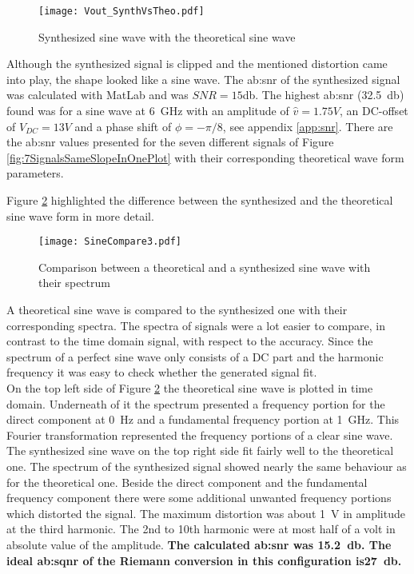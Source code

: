 \begin{figure}[htb!]
   \centering
   \texttt{[image: Vout\_SynthVsTheo.pdf]}
   \caption{Synthesized sine wave with the theoretical sine wave}
   \label{fig:SineWaveSynthVsTheoretical}
\end{figure}
Although the synthesized signal is clipped and the mentioned distortion came into play, the shape looked like a sine wave.
The \gls{ab:snr} of the synthesized signal was calculated with MatLab and was $SNR = 15$\si{\decibel}.
The highest \gls{ab:snr} (\SI{32.5}{\decibel}) found was for a sine wave at \SI{6}{\giga \hertz} with an amplitude of $\hat{v} = 1.75 V$, an DC-offset of $V_{DC} = 13 V$ and a phase shift of $\phi = -\pi/8$, see appendix \ref{app:snr}.
There are the \gls{ab:snr} values presented for the seven different signals of Figure \ref{fig:7SignalsSameSlopeInOnePlot} with their corresponding theoretical wave form parameters.

Figure \ref{fig:SineCompare} highlighted the difference between the synthesized and the theoretical sine wave form in more detail.

\begin{figure}[htb!]
	\centering
  \texttt{[image: SineCompare3.pdf]}
	\caption{Comparison between a theoretical and a synthesized sine wave with their spectrum}
	\label{fig:SineCompare}
\end{figure}

A theoretical sine wave is compared to the synthesized one with their corresponding spectra.
The spectra of signals were a lot easier to compare, in contrast to the time domain signal, with respect to the accuracy.
Since the spectrum of a perfect sine wave only consists of a DC part and the harmonic frequency it was easy to check whether the generated signal fit.\\
On the top left side of Figure \ref{fig:SineCompare} the theoretical sine wave is plotted in time domain. Underneath of it the spectrum presented a frequency portion for the direct component at \SI{0} {\Hz} and a fundamental frequency portion at \SI{1}{\GHz}.
This Fourier transformation represented the frequency portions of a clear sine wave.\\
The synthesized sine wave on the top right side fit fairly well to the theoretical one.
The spectrum of the synthesized signal showed nearly the same behaviour as for the theoretical one.
Beside the direct component and the fundamental frequency component there were some additional unwanted frequency portions which distorted the signal.
The maximum distortion was about \SI{1}{\volt} in amplitude at the third harmonic.
 The 2nd to 10th harmonic were at most half of a volt in absolute value of the amplitude.
 \textbf{The calculated \gls{ab:snr} was \SI{15.2}{\decibel}.
 The ideal \gls{ab:sqnr} of the Riemann conversion in this configuration is\SI{27}{\decibel}.}\\

